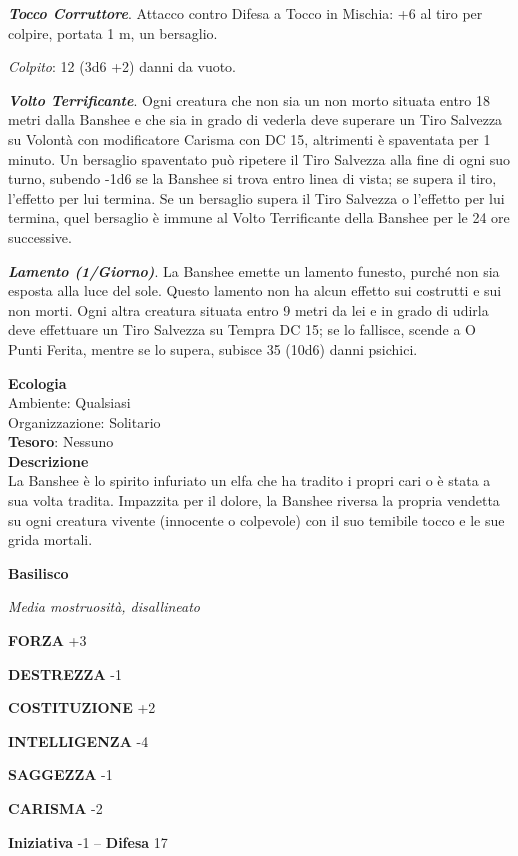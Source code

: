 \begin{multicols}{2}
\textit{\textbf{Tocco Corruttore}}. Attacco contro Difesa a Tocco in Mischia: +6 al tiro per colpire, portata 1 m, un bersaglio.

\textit{Colpito}: 12 (3d6 +2) danni da vuoto.

\textit{\textbf{Volto Terrificante}}. Ogni creatura che non sia un non morto situata entro 18 metri dalla Banshee e che sia in grado di vederla deve superare un Tiro Salvezza su Volontà con modificatore Carisma con DC 15, altrimenti è spaventata per 1 minuto. Un bersaglio spaventato può ripetere il Tiro Salvezza alla fine di ogni suo turno, subendo -1d6 se la Banshee si trova entro linea di vista; se supera il tiro, l'effetto per lui termina. Se un bersaglio supera il Tiro Salvezza o l'effetto per lui termina, quel bersaglio è immune al Volto Terrificante della Banshee per le 24 ore successive.

\textit{\textbf{Lamento (1/Giorno)}}. La Banshee emette un lamento funesto, purché non sia esposta alla luce del sole. Questo lamento non ha alcun effetto sui costrutti e sui non morti. Ogni altra creatura situata entro 9 metri da lei e in grado di udirla deve effettuare un Tiro Salvezza su Tempra DC 15; se lo fallisce, scende a O Punti Ferita, mentre se lo supera, subisce 35 (10d6) danni psichici.

\textbf{Ecologia}\\
Ambiente: Qualsiasi\\
Organizzazione: Solitario\\
\textbf{Tesoro}: Nessuno\\
\textbf{Descrizione}\\
La Banshee è lo spirito infuriato un elfa che ha tradito i propri cari o è stata a sua volta tradita. Impazzita per il dolore, la Banshee riversa la propria vendetta su ogni creatura vivente (innocente o colpevole) con il suo temibile tocco e le sue grida mortali.

\medskip{}\textbf{Basilisco}

\textit{Media mostruosità, disallineato}

\textbf{FORZA} +3

\textbf{DESTREZZA} -1

\textbf{COSTITUZIONE} +2

\textbf{INTELLIGENZA} -4

\textbf{SAGGEZZA} -1

\textbf{CARISMA} -2

\textbf{Iniziativa} -1 -- \textbf{Difesa} 17


\end{multicols}

